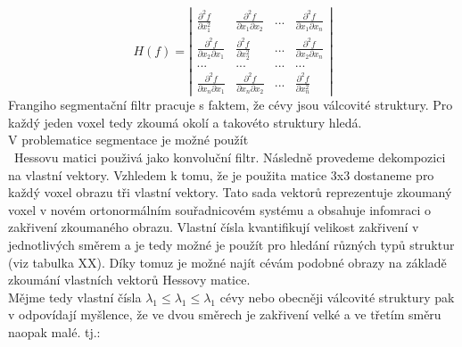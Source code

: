 \documentclass{thesis}%
\begin{document}
\begin{equation}
H(f) = \left| \begin{array}{cccc}
\frac{\partial^2 f}{\partial x_{1}^2} & \frac{\partial^2 f}{\partial x_1 \partial x_2} & ... &  \frac{\partial^2 f}{\partial x_1 \partial x_n}\\
\frac{\partial^2 f}{\partial x_2\partial x_1} & \frac{\partial^2 f}{\partial x_2^2} & ... &  \frac{\partial^2 f}{\partial x_2 \partial x_n}\\
... & ... & ... & ...\\
\frac{\partial^2 f}{\partial x_n \partial x_1} & \frac{\partial^2 f}{\partial x_n \partial x_2} & ... &  \frac{\partial^2 f}{\partial x_n^2}
\end{array} \right|
\end{equation}
Frangiho segmentační filtr pracuje s faktem, že cévy jsou válcovité struktury. Pro každý jeden voxel tedy zkoumá okolí a takovéto struktury hledá.\\ V problematice segmentace je možné použít \\\
Hessovu matici použivá jako konvoluční filtr. Následně provedeme dekompozici na vlastní vektory. Vzhledem k tomu, že je použita matice 3x3 dostaneme pro každý voxel obrazu tři vlastní vektory. Tato sada vektorů reprezentuje zkoumaný voxel v novém ortonormálním souřadnicovém systému a obsahuje infomraci o zakřivení zkoumaného obrazu. Vlastní čísla kvantifikují velikost zakřivení v jednotlivých směrem a je tedy možné je použít pro hledání různých typů struktur (viz tabulka XX). Díky tomuz je možné najít cévám podobné obrazy na základě zkoumání vlastních vektorů Hessovy matice.\\
Mějme tedy vlastní čísla $\lambda_1 \leq \lambda_1 \leq \lambda_1$ cévy nebo obecněji válcovité struktury pak v odpovídají myšlence, že ve dvou směrech je zakřivení velké a ve třetím směru naopak malé. tj.:
\end{document}
